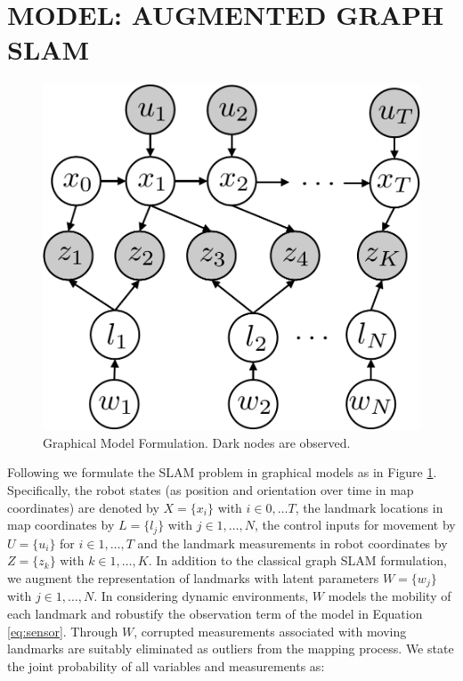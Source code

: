 \section{MODEL: AUGMENTED GRAPH SLAM}
\label{sec:model}
\begin{figure}[!t]
\begin{center}
 \includegraphics[width=0.5\columnwidth]{fig/model} 
\end{center}
\caption{Graphical Model Formulation. Dark nodes are observed.}
\label{fig:model}
\end{figure}

Following \cite{isam} we formulate the SLAM problem in graphical models as in Figure \ref{fig:model}. Specifically, the robot states (as position and orientation over time in map coordinates) are denoted by $X = \{x_i\}$ with $i \in 0, \dots T$, the landmark locations in map coordinates by $L = \{l_j\}$ with $j \in 1,\dots, N$, the control inputs for movement by $U = \{u_i\}$ for $i \in 1,\dots, T$ and the landmark measurements in robot coordinates by $Z = \{z_k\}$ with $k \in 1, \dots, K$. In addition to the classical graph SLAM formulation, we augment the representation of landmarks with latent parameters $W = \{w_j\}$ with $j \in 1, \dots, N$.  In considering dynamic environments, $W$ models the mobility of each landmark and robustify the observation term of the model in Equation \ref{eq:sensor}.  Through $W$, corrupted measurements associated with moving landmarks are suitably eliminated as outliers from the mapping process. We state the joint probability of all variables and measurements as:

